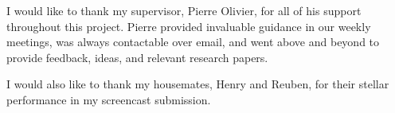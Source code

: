 I would like to thank my supervisor, Pierre Olivier, for all of his support
throughout this project. Pierre provided invaluable guidance in our weekly
meetings, was always contactable over email, and went above and beyond to
provide feedback, ideas, and relevant research papers. 

I would also like to thank my housemates, Henry and Reuben, for their stellar
performance in my screencast submission.

\clearpage

\tableofcontents

\clearpage

\printacronyms[name=Acronyms and Abbreviations]

\clearpage

\listoffigures

\clearpage

\listoftables

\clearpage

\listoflistings
